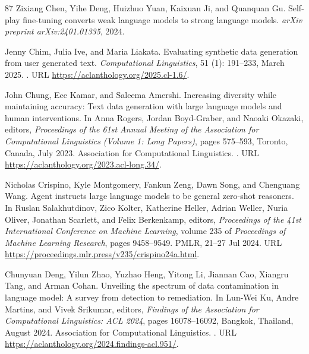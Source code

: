 \begin{thebibliography}{87}
Zixiang Chen, Yihe Deng, Huizhuo Yuan, Kaixuan Ji, and Quanquan Gu.
\newblock Self-play fine-tuning converts weak language models to strong language models.
\newblock \emph{arXiv preprint arXiv:2401.01335}, 2024.

Jenny Chim, Julia Ive, and Maria Liakata.
\newblock Evaluating synthetic data generation from user generated text.
\newblock \emph{Computational Linguistics}, 51 (1): 191--233, March 2025.
\newblock {}.
\newblock URL \url{https://aclanthology.org/2025.cl-1.6/}.

John Chung, Ece Kamar, and Saleema Amershi.
\newblock Increasing diversity while maintaining accuracy: Text data generation with large language models and human interventions.
\newblock In Anna Rogers, Jordan Boyd-Graber, and Naoaki Okazaki, editors, \emph{Proceedings of the 61st Annual Meeting of the Association for Computational Linguistics (Volume 1: Long Papers)}, pages 575--593, Toronto, Canada, July 2023. Association for Computational Linguistics.
\newblock {}.
\newblock URL \url{https://aclanthology.org/2023.acl-long.34/}.

Nicholas Crispino, Kyle Montgomery, Fankun Zeng, Dawn Song, and Chenguang Wang.
\newblock Agent instructs large language models to be general zero-shot reasoners.
\newblock In Ruslan Salakhutdinov, Zico Kolter, Katherine Heller, Adrian Weller, Nuria Oliver, Jonathan Scarlett, and Felix Berkenkamp, editors, \emph{Proceedings of the 41st International Conference on Machine Learning}, volume 235 of \emph{Proceedings of Machine Learning Research}, pages 9458--9549. PMLR, 21--27 Jul 2024.
\newblock URL \url{https://proceedings.mlr.press/v235/crispino24a.html}.

Chunyuan Deng, Yilun Zhao, Yuzhao Heng, Yitong Li, Jiannan Cao, Xiangru Tang, and Arman Cohan.
\newblock Unveiling the spectrum of data contamination in language model: A survey from detection to remediation.
\newblock In Lun-Wei Ku, Andre Martins, and Vivek Srikumar, editors, \emph{Findings of the Association for Computational Linguistics: ACL 2024}, pages 16078--16092, Bangkok, Thailand, August 2024. Association for Computational Linguistics.
\newblock {}.
\newblock URL \url{https://aclanthology.org/2024.findings-acl.951/}.


\end{thebibliography}
